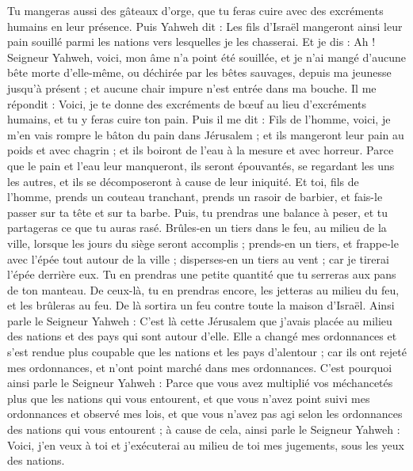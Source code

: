 \begin{multicols}{2}
Tu mangeras aussi des gâteaux d'orge, que tu feras cuire avec des excréments humains en leur présence.
Puis Yahweh dit : Les fils d'Israël mangeront ainsi leur pain souillé parmi les nations vers lesquelles je les chasserai.
Et je dis : Ah ! Seigneur Yahweh, voici, mon âme n'a point été souillée, et je n'ai mangé d'aucune bête morte d'elle-même, ou déchirée par les bêtes sauvages, depuis ma jeunesse jusqu'à présent ; et aucune chair impure n'est entrée dans ma bouche.
Il me répondit : Voici, je te donne des excréments de bœuf au lieu d’excréments humains, et tu y feras cuire ton pain.
Puis il me dit : Fils de l’homme, voici, je m'en vais rompre le bâton du pain dans Jérusalem ; et ils mangeront leur pain au poids et avec chagrin ; et ils boiront de l'eau à la mesure et avec horreur.
Parce que le pain et l'eau leur manqueront, ils seront épouvantés, se regardant les uns les autres, et ils se décomposeront à cause de leur iniquité.
\VerseOne{}Et toi, fils de l’homme, prends un couteau tranchant,  prends un rasoir de barbier, et fais-le passer sur ta tête et sur ta barbe. Puis, tu prendras une balance à peser, et tu partageras ce que tu auras rasé.
Brûles-en un tiers dans le feu, au milieu de la ville, lorsque les jours du siège seront accomplis ; prends-en un tiers, et frappe-le avec l'épée tout autour de la ville ; disperses-en un tiers au vent ; car je tirerai l'épée derrière eux.
Tu en prendras une petite quantité que tu serreras aux pans de ton manteau.
De ceux-là, tu en prendras encore, les jetteras au milieu du feu, et les brûleras au feu. De là sortira un feu contre toute la maison d'Israël.
Ainsi parle le Seigneur Yahweh : C'est là cette Jérusalem que j'avais placée au milieu des nations et des pays qui sont autour d'elle.
Elle a changé mes ordonnances et s’est rendue plus coupable  que les nations et les pays d’alentour ; car ils ont rejeté mes ordonnances, et n'ont point marché dans mes ordonnances.
C'est pourquoi ainsi parle le Seigneur Yahweh : Parce que vous avez multiplié vos méchancetés plus que les nations qui vous entourent, et que vous n'avez point suivi mes ordonnances et observé mes lois, et que vous n'avez pas agi selon les ordonnances des nations qui vous entourent ;
à cause de cela, ainsi parle le Seigneur Yahweh : Voici, j'en veux à toi et j'exécuterai au milieu de toi mes jugements, sous les yeux des nations.

\end{multicols}

